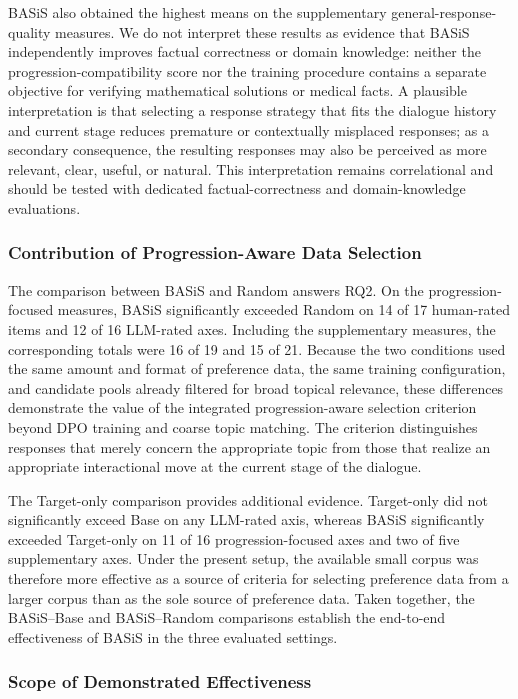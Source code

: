 \documentclass[manuscript,review,anonymous]{acmart}
\begin{document}
BASiS also obtained the highest means on the supplementary general-response-quality measures. We do not interpret these results as evidence that BASiS independently improves factual correctness or domain knowledge: neither the progression-compatibility score nor the training procedure contains a separate objective for verifying mathematical solutions or medical facts. A plausible interpretation is that selecting a response strategy that fits the dialogue history and current stage reduces premature or contextually misplaced responses; as a secondary consequence, the resulting responses may also be perceived as more relevant, clear, useful, or natural. This interpretation remains correlational and should be tested with dedicated factual-correctness and domain-knowledge evaluations.

\subsubsection{Contribution of Progression-Aware Data Selection}

The comparison between BASiS and Random answers RQ2. On the progression-focused measures, BASiS significantly exceeded Random on 14 of 17 human-rated items and 12 of 16 LLM-rated axes. Including the supplementary measures, the corresponding totals were 16 of 19 and 15 of 21. Because the two conditions used the same amount and format of preference data, the same training configuration, and candidate pools already filtered for broad topical relevance, these differences demonstrate the value of the integrated progression-aware selection criterion beyond DPO training and coarse topic matching. The criterion distinguishes responses that merely concern the appropriate topic from those that realize an appropriate interactional move at the current stage of the dialogue.

The Target-only comparison provides additional evidence. Target-only did not significantly exceed Base on any LLM-rated axis, whereas BASiS significantly exceeded Target-only on 11 of 16 progression-focused axes and two of five supplementary axes. Under the present setup, the available small corpus was therefore more effective as a source of criteria for selecting preference data from a larger corpus than as the sole source of preference data. Taken together, the BASiS--Base and BASiS--Random comparisons establish the end-to-end effectiveness of BASiS in the three evaluated settings.

\subsubsection{Scope of Demonstrated Effectiveness}
\end{document}
